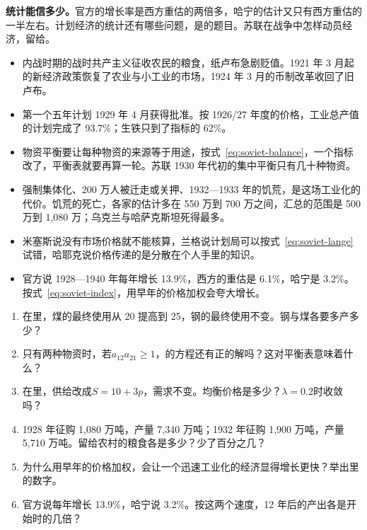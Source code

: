 \textbf{统计能信多少。}官方的增长率是西方重估的两倍多，哈宁的估计又只有西方重估的一半左右\cite{harrison1993}。计划经济的统计还有哪些问题，是的题目。苏联在战争中怎样动员经济，留给。

\begin{takeaways}
\begin{itemize}
\item 内战时期的战时共产主义征收农民的粮食，纸卢布急剧贬值。1921 年 3 月起的新经济政策恢复了农业与小工业的市场，1924 年 3 月的币制改革收回了旧卢布。
\item 第一个五年计划 1929 年 4 月获得批准。按 1926/27 年度的价格，工业总产值的计划完成了 93.7\%；生铁只到了指标的 62\%。
\item 物资平衡要让每种物资的来源等于用途，按式~\eqref{eq:soviet-balance}，一个指标改了，平衡表就要再算一轮。苏联 1930 年代初的集中平衡只有几十种物资。
\item 强制集体化、200 万人被迁走或关押、1932—1933 年的饥荒，是这场工业化的代价。饥荒的死亡，各家的估计多在 550 万到 700 万之间，汇总的范围是 500 万到 1,080 万；乌克兰与哈萨克斯坦死得最多。
\item 米塞斯说没有市场价格就不能核算，兰格说计划局可以按式~\eqref{eq:soviet-lange}试错，哈耶克说价格传递的是分散在个人手里的知识。
\item 官方说 1928—1940 年每年增长 13.9\%，西方的重估是 6.1\%，哈宁是 3.2\%。按式~\eqref{eq:soviet-index}，用早年的价格加权会夸大增长。
\end{itemize}
\end{takeaways}

\begin{selfcheck}
\begin{enumerate}
\item 在里，煤的最终使用从 20 提高到 25，钢的最终使用不变。钢与煤各要多产多少？
\item 只有两种物资时，若$a_{12}a_{21}\geq1$，的方程还有正的解吗？这对平衡表意味着什么？
\item 在里，供给改成$S=10+3p$，需求不变。均衡价格是多少？$\lambda=0.2$时收敛吗？
\item 1928 年征购 1,080 万吨，产量 7,340 万吨；1932 年征购 1,900 万吨，产量 5,710 万吨。留给农村的粮食各是多少？少了百分之几？
\item 为什么用早年的价格加权，会让一个迅速工业化的经济显得增长更快？举出里的数字。
\item 官方说每年增长 13.9\%，哈宁说 3.2\%。按这两个速度，12 年后的产出各是开始时的几倍？
\end{enumerate}
\end{selfcheck}

